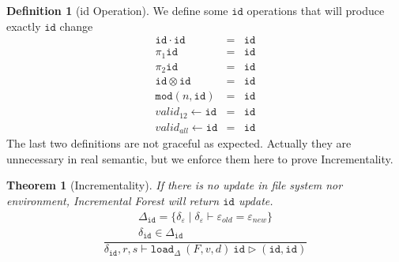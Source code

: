 \documentclass[10pt,twoside,a4paper]{article}
\theoremstyle{theorem}
\newtheorem{theorem}{Theorem}[section]
\theoremstyle{lemma}
\theoremstyle{property}
\theoremstyle{definition}
\newtheorem{definition}{Definition}[section]
\theoremstyle{assumption}
\def\fst{\pi_1}
\def\snd{\pi_2}
\def\id{\mathtt{id}}
\begin{document}
\newpage

\begin{definition}[id Operation]
We define some $\id$ operations that will produce exactly $\id$ change
\begin{eqnarray}
	\id \cdot \id &=& \id\\
	\fst\id &=& \id\\
	\snd\id &=& \id\\
	\id \otimes \id &=& \id\\
	\mathtt{mod}(n, \id) &=& \id\\
	valid_{12} \leftarrow \id &=& \id\\
	valid_{all} \leftarrow \id &=& \id
\end{eqnarray}
The last two definitions are not graceful as expected. Actually they are unnecessary in real semantic, but we enforce them here to prove Incrementality.
\end{definition}

\begin{theorem}[Incrementality]
If there is no update in file system nor environment, Incremental Forest will return $\id$ update.
\begin{displaymath}
\frac{\begin{array}{c}
	\Delta_{\id} = \{\delta_\varepsilon \mid \delta_\varepsilon \vdash \varepsilon_{old} = \varepsilon_{new}\} \\
	\delta_{\id} \in \Delta_{\id}
\end{array}}
	{\delta_{\id}, r, s \vdash \mathtt{load}_\Delta~ (F,v,d)~ \mathtt{id} \rhd (\mathtt{id}, \mathtt{id})}
\end{displaymath}

\end{theorem}
\end{document}
